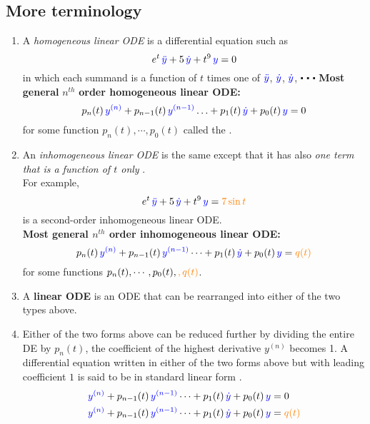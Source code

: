 \subsection{More terminology}
\begin{enumerate}
\item A \emph{\color{blue} homogeneous linear ODE} is a differential equation such as
  \begin{equation*}
    e^ t \,  {\color{blue}{\ddot{y}}}  + 5 \,  {\color{blue}{\dot{y}}}  + t^9 \,  {\color{blue}{y}}  = 0
  \end{equation*}
  in which each summand is a function of $t$ times one of $\color{blue}{\ddot{y}}$,
  $\color{blue}{\dot{y}}$, $\color{blue}{\dot{y}}$, $\centerdot$ $\centerdot$  $\centerdot$
  \textbf{Most general} $n^{th}$ \textbf{order homogeneous linear ODE:}
  \begin{equation*}
    p_ n(t) \,  {\color{blue}{y^{(n)}}}  + p_{n - 1}(t) \,  {\color{blue}{y^{(n-1)}}}  \dotsc + p_1(t) \,  {\color{blue}{\dot{y}}}
    + p_0(t) \,  {\color{blue}{y}}  = 0
  \end{equation*}
  for some function $p_n(t), \cdots, p_0(t)$ called the {\color{blue}{coefficient}}.
\item An \emph{\color{blue} inhomogeneous linear ODE} is the same except that it has also
  \emph{\color{orange} one term that is a function of $t$ only} . \\
  For example,
  \begin{equation*}
    e^ t \,  {\color{blue}{\ddot{y}}}  + 5 \,  {\color{blue}{\dot{y}}}  + t^9 \,
    {\color{blue}{y}}  = {\color{orange}{7 \sin t}}
  \end{equation*}
  is a second-order inhomogeneous linear ODE.\\
  \textbf{Most general $n^{th}$ order inhomogeneous linear ODE:}
  \begin{equation*}
    p_ n(t) \,  {\color{blue}{y^{(n)}}}  + p_{n-1}(t) \,  {\color{blue}{y^{(n-1)}}}  \dotsb + p_1(t) \,
    {\color{blue}{\dot{y}}}  + p_0(t) \,  {\color{blue}{y}}  = {\color{orange}{q(t)}}
  \end{equation*}
  for some functions $p_n(t), \cdots , p_0(t), {\color{orange}, q(t)}$. \\
\item A \textbf{\color{blue} linear ODE} is an ODE that can be rearranged into either of the two types above.
\item Either of the two forms above can be reduced further by dividing the entire DE by $p_n(t)$,
  the coefficient of the highest derivative $y^{(n)}$ becomes 1.
  A differential equation written in either of the two forms above but with leading coefficient $1$ is said to be in standard linear form .
  \begin{align*}
    &{\color{blue}{y^{(n)}}}  + p_{n-1}(t) \,  {\color{blue}{y^{(n-1)}}}  \dotsb + p_1(t) \,
    {\color{blue}{\dot{y}}}  + p_0(t) \,  {\color{blue}{y}}  = 0\\
    &{\color{blue}{y^{(n)}}}  + p_{n-1}(t) \,  {\color{blue}{y^{(n-1)}}}  \dotsb + p_1(t) \,
    {\color{blue}{\dot{y}}}  + p_0(t) \,  {\color{blue}{y}}  = {\color{orange}{q(t)}}
  \end{align*}
\end{enumerate}

